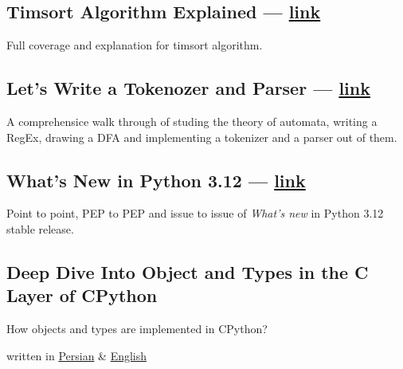 \begin{multicols}{2}
\subsection{{Timsort Algorithm Explained --- \href{https://virgool.io/@liewpl/timsort-algorithm-explained-u41h0wv0jnax}{link}}}
\begin{zitemize}
\item Full coverage and explanation for {\ttfamily timsort} algorithm.
\end{zitemize}

\subsection{{Let's Write a Tokenozer and Parser --- \href{https://virgool.io/@liewpl/tokenizer-parser-in-python-ubzlsvukmdxz}{link}}}
\begin{zitemize}
\item A comprehensice walk through of studing the theory of automata, writing a RegEx, drawing a DFA and implementing a tokenizer and a parser out of them.
\end{zitemize}

\subsection{{What's New in Python 3.12 --- \href{https://virgool.io/@liewpl/python-3-12-whats-new-vpq99njtytc6}{link}}}
\begin{zitemize}
\item Point to point, PEP to PEP and issue to issue of \textit{What's new} in Python 3.12 stable release.
\end{zitemize}

\subsection{{Deep Dive Into Object and Types in the C Layer of CPython}}
\begin{zitemize}
\item How objects and types are implemented in CPython?
\item written in \href{https://virgool.io/@liewpl/cpython-objs-types-c-layer-deep-dive-m5fjelhzrzny}{Persian}
\& \href{https://virgool.io/@liewpl/cpython-objs-types-c-layer-deep-dive-m5fjelhzrzny}{English}
\end{zitemize}


\end{multicols}

